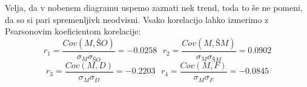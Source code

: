 \documentclass[a4paper,11pt]{article}
\begin{document}
\begin{figure}
    \centering
\end{figure}
Velja, da v nobenem diagramu uspemo zaznati nek trend, toda to še ne pomeni, da so si pari spremenljivk neodvisni. Vsako korelacijo lahko izmerimo z Pearsonovim koeficientom korelacije:
\[r_1 = \frac{Cov(M,ŠO)}{\sigma_{M} \sigma_{ŠO}} = -0.0258 \text{ } r_2 = \frac{Cov(M,ŠM)}{\sigma_{M} \sigma_{ŠM}} = 0.0902\]
\[r_3 = \frac{Cov(M,D)}{\sigma_{M} \sigma_{D}} = -0.2203 \text{ } r_4 = \frac{Cov(M,F)}{\sigma_{M} \sigma_{F}} = -0.0845\]
\end{document}
